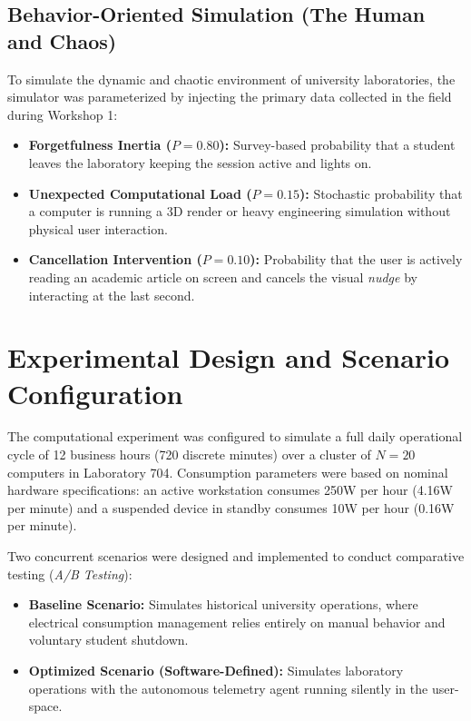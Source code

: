 \documentclass[12pt,a4paper]{article}
\begin{document}
\subsection{Behavior-Oriented Simulation (The Human and Chaos)}
To simulate the dynamic and chaotic environment of university laboratories, the simulator was parameterized by injecting the primary data collected in the field during Workshop 1:
\begin{itemize}[leftmargin=1.2cm]
    \item \textbf{Forgetfulness Inertia ($P = 0.80$):} Survey-based probability that a student leaves the laboratory keeping the session active and lights on.
    \item \textbf{Unexpected Computational Load ($P = 0.15$):} Stochastic probability that a computer is running a 3D render or heavy engineering simulation without physical user interaction.
    \item \textbf{Cancellation Intervention ($P = 0.10$):} Probability that the user is actively reading an academic article on screen and cancels the visual \textit{nudge} by interacting at the last second.
\end{itemize}

\section{Experimental Design and Scenario Configuration}
The computational experiment was configured to simulate a full daily operational cycle of 12 business hours (720 discrete minutes) over a cluster of $N=20$ computers in Laboratory 704. Consumption parameters were based on nominal hardware specifications: an active workstation consumes 250W per hour (4.16W per minute) and a suspended device in standby consumes 10W per hour (0.16W per minute).

Two concurrent scenarios were designed and implemented to conduct comparative testing (\textit{A/B Testing}):
\begin{itemize}[leftmargin=1.2cm]
    \item \textbf{Baseline Scenario:} Simulates historical university operations, where electrical consumption management relies entirely on manual behavior and voluntary student shutdown.
    \item \textbf{Optimized Scenario (Software-Defined):} Simulates laboratory operations with the autonomous telemetry agent running silently in the user-space.
\end{itemize}
\end{document}
